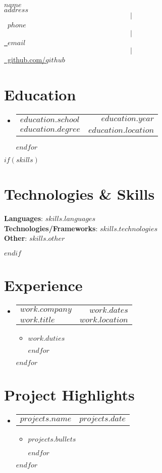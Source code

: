 \documentclass[letterpaper,11pt]{article}
\makeatletter
\newcommand{\resumeItem}[1]{
  \item{
    {#1 \vspace{-2pt}}
  }
}
\newcommand{\resumeSubheading}[4]{
  \vspace{-2pt}\item
    \begin{tabular*}{1.0\textwidth}[t]{l@{\extracolsep{\fill}}r}
      \textbf{#1} & \textbf{\small #2} \\
      \textit{\small#3} & \textit{\small #4} \\
    \end{tabular*}\vspace{-7pt}
}
\newcommand{\resumeProjectHeading}[2]{
    \item
    \begin{tabular*}{1.001\textwidth}{l@{\extracolsep{\fill}}r}
      \small#1 & \textbf{\small #2}\\
    \end{tabular*}\vspace{-7pt}
}
\newcommand{\resumeSubHeadingListStart}{\begin{itemize}[leftmargin=0.0in, label={}]}
\newcommand{\resumeSubHeadingListEnd}{\end{itemize}}
\newcommand{\resumeItemListStart}{\begin{itemize}}
\newcommand{\resumeItemListEnd}{\end{itemize}\vspace{-5pt}}
\makeatother
\begin{document}
\begin{center}
    {\Huge \scshape $name$} \\ \vspace{10pt}
	\small $address$ $$|$$ \small \raisebox{-0.1\height}\ $phone$ ~ $$|$$ \href{mailto:$email$}{\raisebox{-0.2\height}\  $email$} ~ $$|$$
    \href{https://github.com/$github$}{\raisebox{-0.2\height}\ github.com/$github$}
    \vspace{-8pt}
\end{center}


\section{Education}
  \resumeSubHeadingListStart
  $for(education)$  
	\resumeSubheading
	{$education.school$}{$education.year$}
	{$education.degree$}{$education.location$}
  $endfor$
  \resumeSubHeadingListEnd

$if(skills)$
\section{Technologies \& Skills}
\begin{itemize}[leftmargin=0.15in, label={}]
    \small{\item{
    \textbf{Languages}{: $skills.languages$} \\
    \textbf{Technologies/Frameworks}{: $skills.technologies$} \\
    \textbf{Other}{: $skills.other$} \\
    }}
\end{itemize}
\vspace{-20pt}
$endif$



\section{Experience}
  \resumeSubHeadingListStart
  $for(work)$
    \resumeSubheading{$work.company$}{$work.dates$}{$work.title$}{$work.location$}
    \resumeItemListStart
    $for(work.duties)$
      \resumeItem{$work.duties$}
    $endfor$
    \resumeItemListEnd
  $endfor$
  \resumeSubHeadingListEnd


\section{Project Highlights}
    \vspace{-5pt}
    \resumeSubHeadingListStart
    $for(projects)$
      \resumeProjectHeading
        {\textbf{$projects.name$}}{$projects.date$}
        \resumeItemListStart
        $for(projects.bullets)$
          \resumeItem{$projects.bullets$}
        $endfor$
        \resumeItemListEnd
        \vspace{-13pt}
    $endfor$
    \resumeSubHeadingListEnd
\vspace{5pt}


%
\end{document}
